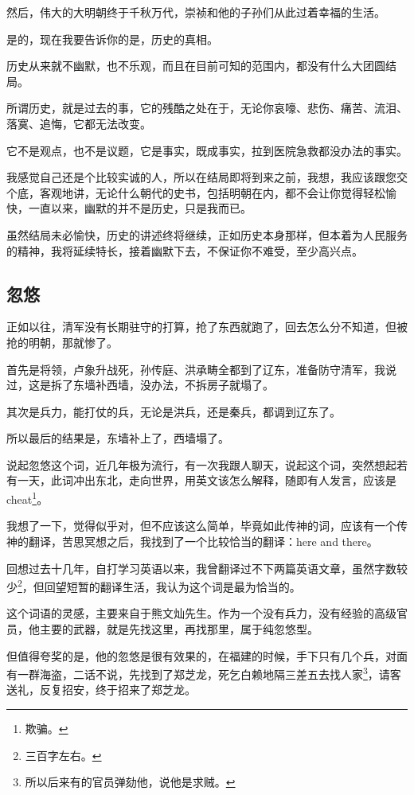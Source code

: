 \begin{multicols}{\theparacolNo}
		然后，伟大的大明朝终于千秋万代，崇祯和他的子孙们从此过着幸福的生活。

		是的，现在我要告诉你的是，历史的真相。

		历史从来就不幽默，也不乐观，而且在目前可知的范围内，都没有什么大团圆结局。

		所谓历史，就是过去的事，它的残酷之处在于，无论你哀嚎、悲伤、痛苦、流泪、落寞、追悔，它都无法改变。

		它不是观点，也不是议题，它是事实，既成事实，拉到医院急救都没办法的事实。

		我感觉自己还是个比较实诚的人，所以在结局即将到来之前，我想，我应该跟您交个底，客观地讲，无论什么朝代的史书，包括明朝在内，都不会让你觉得轻松愉快，一直以来，幽默的并不是历史，只是我而已。

		虽然结局未必愉快，历史的讲述终将继续，正如历史本身那样，但本着为人民服务的精神，我将延续特长，接着幽默下去，不保证你不难受，至少高兴点。

		\subsection{忽悠}
		正如以往，清军没有长期驻守的打算，抢了东西就跑了，回去怎么分不知道，但被抢的明朝，那就惨了。

		首先是将领，卢象升战死，孙传庭、洪承畴全都到了辽东，准备防守清军，我说过，这是拆了东墙补西墙，没办法，不拆房子就塌了。

		其次是兵力，能打仗的兵，无论是洪兵，还是秦兵，都调到辽东了。

		所以最后的结果是，东墙补上了，西墙塌了。

		说起忽悠这个词，近几年极为流行，有一次我跟人聊天，说起这个词，突然想起若有一天，此词冲出东北，走向世界，用英文该怎么解释，随即有人发言，应该是cheat\footnote{欺骗。}。

		我想了一下，觉得似乎对，但不应该这么简单，毕竟如此传神的词，应该有一个传神的翻译，苦思冥想之后，我找到了一个比较恰当的翻译：here and there。

		回想过去十几年，自打学习英语以来，我曾翻译过不下两篇英语文章，虽然字数较少\footnote{三百字左右。}，但回望短暂的翻译生活，我认为这个词是最为恰当的。

		这个词语的灵感，主要来自于熊文灿先生。作为一个没有兵力，没有经验的高级官员，他主要的武器，就是先找这里，再找那里，属于纯忽悠型。

		但值得夸奖的是，他的忽悠是很有效果的，在福建的时候，手下只有几个兵，对面有一群海盗，二话不说，先找到了郑芝龙，死乞白赖地隔三差五去找人家\footnote{所以后来有的官员弹劾他，说他是求贼。}，请客送礼，反复招安，终于招来了郑芝龙。


\end{multicols}

